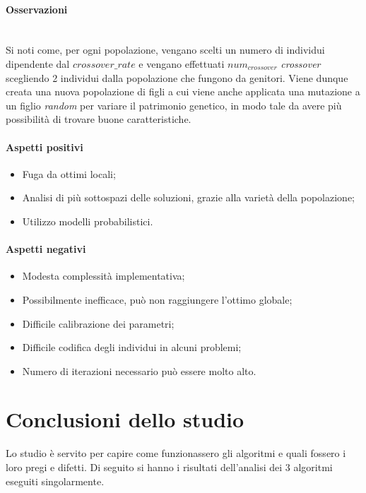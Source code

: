 \noindent \paragraph{Osservazioni}\hfill\\
Si noti come, per ogni popolazione, vengano scelti un numero di individui dipendente dal {$crossover\_rate$}
e vengano effettuati {$num_{crossover}$} \textit{crossover} scegliendo 2 individui dalla popolazione che fungono da genitori.
Viene dunque creata una nuova popolazione di figli a cui viene anche applicata una mutazione a un figlio \textit{random} per
variare il patrimonio genetico, in modo tale da avere più possibilità di trovare buone caratteristiche.

\noindent \paragraph{Aspetti positivi}
\begin{itemize}
    \item Fuga da ottimi locali;
    \item Analisi di più sottospazi delle soluzioni, grazie alla varietà della popolazione;
    \item Utilizzo modelli probabilistici.
\end{itemize}

\noindent \paragraph{Aspetti negativi}
\begin{itemize}
    \item Modesta complessità implementativa;
    \item Possibilmente inefficace, può non raggiungere l'ottimo globale;
    \item Difficile calibrazione dei parametri;
    \item Difficile codifica degli individui in alcuni problemi;
    \item Numero di iterazioni necessario può essere molto alto.
\end{itemize}
\newpage
\section{Conclusioni dello studio}
\label{conclusione-studio-fattibilita}
\noindent Lo studio è servito per capire come funzionassero gli algoritmi e quali fossero i loro pregi e difetti.
Di seguito si hanno i risultati dell'analisi dei 3 algoritmi eseguiti singolarmente.\\

